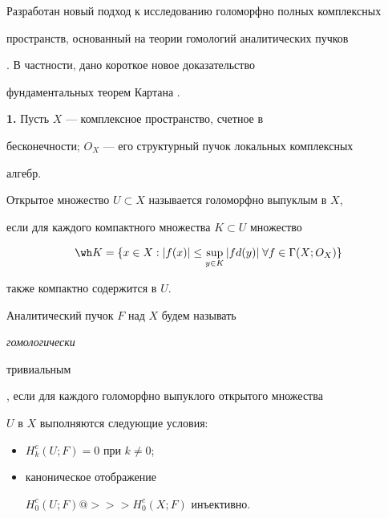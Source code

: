  


 




 


\maketitle 


\label{begin} 


 


Разработан новый подход к исследованию голоморфно полных комплексных 


пространств, основанный на теории гомологий аналитических пучков 


\cite{1}. В частности, дано короткое новое доказательство 


фундаментальных теорем Картана \cite{2}. 


\medskip 


 


{\bf 1.} Пусть $X$ --- комплексное пространство, счетное в 


бесконечности; $O_X$ --- его структурный пучок локальных комплексных 


алгебр. 


 


Открытое множество $U\subset X$ называется голоморфно выпуклым в $X$, 


если для каждого компактного множества $K\subset U$ множество 


$$ 


\wh K=\{x\in X:|f(x)|\le\sup_{y\in K}|fd(y)|\;\forall  


f\in\Gamma(X;O_X)\} 


$$ 


также компактно содержится в $U$. 


 


Аналитический пучок $F$ над $X$ будем называть {\it гомологически 


тривиальным}, если для каждого голоморфно выпуклого открытого множества 


$U$ в $X$ выполняются следующие условия: 


\begin{itemize} 


\item[a)] $H^c_k(U;F)=0$ при $k\ne 0$; 


\item[б)] каноническое отображение 


$H^c_0(U;F)@>>>H^c_0(X;F)$ инъективно. 


\end{itemize} 


